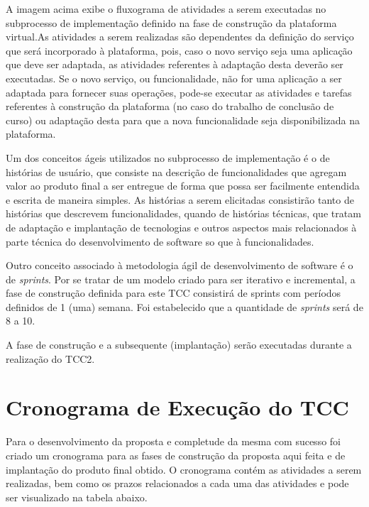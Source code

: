 A imagem acima exibe o fluxograma de atividades a serem executadas no subprocesso de implementação definido na fase de construção da plataforma virtual.As atividades a serem realizadas são dependentes da definição do serviço que será incorporado à plataforma, pois, caso o novo serviço seja uma aplicação que deve ser adaptada, as atividades referentes à adaptação desta deverão ser executadas. Se o novo serviço, ou funcionalidade, não for uma aplicação a ser adaptada para fornecer suas operações, pode-se executar as atividades e tarefas referentes à construção da plataforma (no caso do trabalho de conclusão de curso) ou adaptação desta para que a nova funcionalidade seja disponibilizada na plataforma.

Um dos conceitos ágeis utilizados no subprocesso de implementação é o de histórias de usuário, que consiste na descrição de funcionalidades que agregam valor ao produto final a ser entregue de forma que possa ser facilmente entendida e escrita de maneira simples. As histórias a serem elicitadas consistirão tanto de histórias que descrevem funcionalidades, quando de histórias técnicas, que tratam de adaptação e implantação de tecnologias e outros aspectos mais relacionados à parte técnica do desenvolvimento de software so que à funcionalidades.

Outro conceito associado à metodologia ágil de desenvolvimento de software é o de \textit{sprints}. Por se tratar de um modelo criado para ser iterativo e incremental, a fase de construção definida para este TCC consistirá de sprints com períodos definidos de 1 (uma) semana. Foi estabelecido que a quantidade de \textit{sprints} será de 8 a 10.

A fase de construção e a subsequente (implantação) serão executadas durante a realização do TCC2.

\section{Cronograma de Execução do TCC}
Para o desenvolvimento da proposta e completude da mesma com sucesso foi criado um cronograma para as fases de construção da proposta aqui feita e de implantação do produto final obtido. O cronograma contém as atividades a serem realizadas, bem como os prazos relacionados a cada uma das atividades e pode ser visualizado na tabela abaixo.

